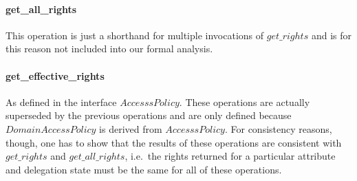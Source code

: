 \paragraph{get\_all\_rights}
This operation is just a shorthand for multiple invocations of $get\_rights$ and
is for this reason not included into our formal analysis.

\paragraph{get\_effective\_rights}


As defined in the interface $AccesssPolicy$.  These operations are actually
superseded by the previous operations and are only defined because
$DomainAccessPolicy$ is derived from $AccesssPolicy$.  For consistency reasons,
though, one has to show that the results of these operations are consistent with
$get\_rights$ and $get\_all\_rights$, i.e.\ the rights returned for a particular
attribute and delegation state must be the same for all of these operations.

